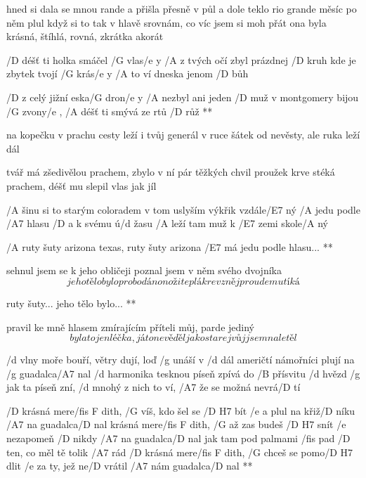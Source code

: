 hned si dala se mnou rande a přišla přesně v půl
a dole teklo rio grande měsíc po něm plul
když si to tak v hlavě srovnám, co víc jsem si moh přát
ona byla krásná, štíhlá, rovná, zkrátka akorát \s




/D déšť ti holka smáčel /G vlas/e y
/A z tvých očí zbyl prázdnej /D kruh
kde je zbytek tvojí /G krás/e y
/A to ví dneska jenom /D bůh

\R /D z celý jižní eska/G dron/e y /A nezbyl ani jeden /D muž
   v montgomery bijou /G zvony/e , /A déšť ti smývá ze rtů /D růž **

na kopečku v prachu cesty leží i tvůj generál
v ruce šátek od nevěsty, ale ruka leží dál \s

tvář má zšedivělou prachem, zbylo v ní pár těžkých chvil
proužek krve stéká prachem, déšť mu slepil vlas jak jíl




/A šinu si to starým coloradem
v tom uslyším výkřik vzdále/E7 ný
/A jedu podle /A7 hlasu /D a k svému ú/d žasu
/A leží tam muž k /E7 zemi skole/A ný

\R /A ruty šuty arizona texas, ruty šuty arizona /E7 má
   jedu podle hlasu... **

sehnul jsem se k jeho obličeji
poznal jsem v něm svého dvojníka
\[ jeho tělo bylo probodáno noži
teplá krev z něj proudem utíká \]\s

\R ruty šuty...
   jeho tělo bylo... **

pravil ke mně hlasem  zmírajícím
příteli můj, parde jediný
\[ byla to jen léčka, já to nevěděl
jako starej vůj jsem naletěl \]\s




/d vlny moře bouří, větry dují, loď /g unáší v /d dál
američtí námořníci plují na /g guadalca/A7 nal
/d harmonika tesknou píseň zpívá do /B přísvitu /d hvězd
/g jak ta píseň zní, /d mnohý z nich to ví, /A7 že se možná nevrá/D tí \songgg

\R /D krásná mere/{fis F\heart } dith, /G víš, kdo šel se /{D H7} bít
   /e a plul na křiž/D níku /A7 na guadalca/D nal
   krásná mere/{fis F\heart } dith, /G až zas budeš /{D H7} snít
   /e nezapomeň /D nikdy /A7 na guadalca/D nal
   jak tam pod palmami /fis pad /D ten, co měl tě tolik /A7 rád
   /D krásná mere/{fis F\heart } dith, /G chceš se pomo/{D H7} dlit
   /e za ty, jež ne/D vrátil /A7 nám guadalca/D nal **

